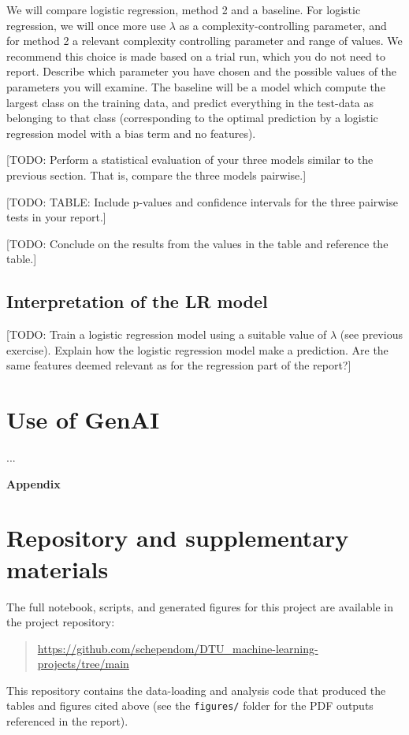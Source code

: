 \documentclass[dtu]{dtuarticle}
\newcommand{\todo}[1]{\color{red}[TODO: #1]\color{black}}
\begin{document}
	We will compare logistic regression, method 2 and a baseline. For logistic regression, we
	will once more use $\lambda$ as a complexity-controlling parameter, and for method 2 a relevant
	complexity controlling parameter and range of values. We recommend this choice is made
	based on a trial run, which you do not need to report. Describe which parameter you have
	chosen and the possible values of the parameters you will examine. The baseline will be a
	model which compute the largest class on the training data, and predict everything in the
	test-data as belonging to that class (corresponding to the optimal prediction by a logistic
	regression model with a bias term and no features).

	\todo{Perform a statistical evaluation of your three models similar to the previous section. That
		is, compare the three models pairwise.}

	\todo{TABLE: Include p-values and confidence intervals for the three pairwise tests in your report.}

	\todo{Conclude on the results from the values in the table and reference the table.}

	\subsection{Interpretation of the LR model}

	\todo{Train a logistic regression model using a suitable value of $\lambda$ (see previous exercise). Explain
		how the logistic regression model make a prediction. Are the same features deemed relevant
		as for the regression part of the report?}


	\section*{Use of GenAI}

	...

	
	

	\vspace*{1cm}
	\appendix

	\LARGE\bfseries Appendix

	\normalsize\normalfont

	\section{Repository and supplementary materials}
	The full notebook, scripts, and generated figures for this project are available in the project repository:
	\begin{quote}
	\url{https://github.com/schependom/DTU\_machine-learning-projects/tree/main}
	\end{quote}
	This repository contains the data-loading and analysis code that produced the tables and figures cited
	above (see the \texttt{figures/} folder for the PDF outputs referenced in the report).
%
%

\end{document}
